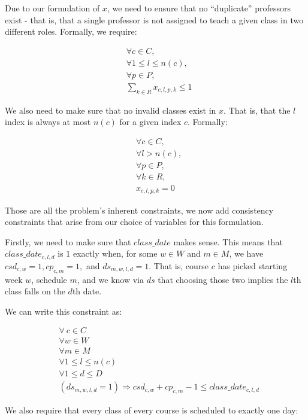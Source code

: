 Due to our formulation of $x$, we need to ensure that no ``duplicate'' professors exist - that is, that a single professor is not assigned to teach a given class in two different roles. Formally, we require:

\begin{align}
  &\forall c \in C,\\
  &\forall 1 \le l \le n(c),\\
  &\forall p \in P,\\
  &\sum_{k \in R} x_{c, l, p, k} \le 1
\end{align}

We also need to make sure that no invalid classes exist in $x$. That is, that the $l$ index is always at most $n(c)$ for a given index $c$. Formally:

\begin{align} \label{eq:noinvalidclasses}
 &\forall c\in C,\\
 &\forall l > n(c),\\
 &\forall p \in P,\\
 &\forall k \in R,\\
 &x_{c, l, p, k} = 0
\end{align}

Those are all the problem's inherent constraints, we now add consistency constraints that arise from our choice of variables for this formulation.

Firstly, we need to make sure that $class\_date$ makes sense. This means that $class\_date_{c, l, d}$ is $1$ exactly when, for some $w \in W$ and $m \in M$, we have $csd_{c, w} = 1, cp_{c, m} = 1,$ and $ds_{m, w, l, d} = 1$. That is, course $c$ has picked starting week $w$, schedule $m$, and we know via $ds$ that choosing those two implies the $l$th class falls on the $d$th date.

We can write this constraint as:

\begin{align}
  &\forall\ c \in C\\
  &\forall w \in W\\
  &\forall m \in M\\
  &\forall 1 \le l \le n(c)\\
  &\forall 1 \le d \le D\\
  &(ds_{m, w, l, d} = 1) \Rightarrow csd_{c, w} + cp_{c, m} - 1 \le class\_date_{c, l, d}
\end{align}

We also require that every class of every course is scheduled to exactly one day:


